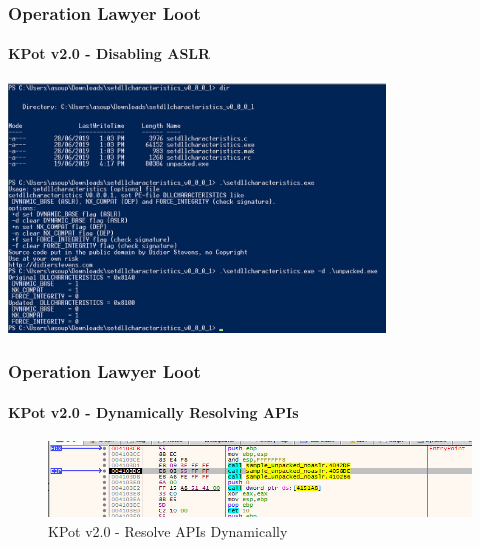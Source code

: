 \documentclass[aspectratio=169]{beamer}
\begin{document}
{
\begin{frame}
  \frametitle{Operation Lawyer Loot}
  \framesubtitle{KPot v2.0 - Disabling ASLR}
  \begin{center}
    \includegraphics[width=10cm]{kpot-disable-aslr}
  \end{center}
\end{frame}
}

{
\begin{frame}
  \frametitle{Operation Lawyer Loot}
  \framesubtitle{KPot v2.0 - Dynamically Resolving APIs}
  \begin{figure}
    \includegraphics[width=14cm]{kpot-resolve-apis-debug}
    \caption{KPot v2.0 - Resolve APIs Dynamically}
  \end{figure}
\end{frame}
}
\end{document}
